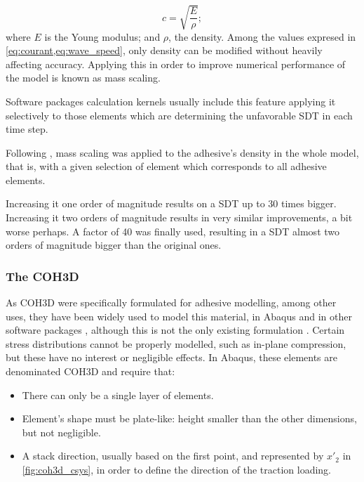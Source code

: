 \documentclass[cmfonts]{witpress}
\begin{document}
\begin{equation}
c = \sqrt{\frac{E}{\rho}} ;
\label{eq:wave_speed}
\end{equation}
where $E$ is the Young modulus; and $\rho$, the density. Among the values expresed in \cref{eq:courant,eq:wave_speed}, only density can be modified without heavily affecting accuracy. Applying this in order to improve numerical performance of the model is known as mass scaling.

Software packages calculation kernels usually include this feature applying it selectively to those elements which are determining the unfavorable SDT in each time step.

Following \cite{Scattina2011}, mass scaling was applied to the adhesive's density in the whole model, that is, with a given selection of element which corresponds to all adhesive elements.

Increasing it one order of magnitude results on a SDT up to 30 times bigger. Increasing it two orders of magnitude results in very similar improvements, a bit worse perhaps. A factor of 40 was finally used, resulting in a SDT almost two orders of magnitude bigger than the original ones.

\subsubsection{The COH3D}
\label{sec:coh_elem}

As COH3D were specifically formulated for adhesive modelling, among other uses, they have been widely used to model this material, in Abaqus \cite{Sadowski2010, Sadowski2011, Sadowski2014, Alvarez2014} and in other software packages \cite{Sato2000, Carlberger2007, Loureiro2010, Scattina2011, Ghasemnejad2013}, although this is not the only existing formulation \cite{Sato2000, Greve2007, Liao2011, Yang2012}. Certain stress distributions cannot be properly modelled, such as in-plane compression, but these have no interest or negligible effects. In Abaqus, these elements are denominated COH3D and require that:
\begin{itemize}
	\item There can only be a single layer of elements.

	\item Element's shape must be plate-like: height smaller than the other dimensions, but not negligible.

	\item A stack direction, usually based on the first point, and represented by $x'_{2}$ in \cref{fig:coh3d_csys}, in order to define the direction of the traction loading.
\end{itemize}
\end{document}
